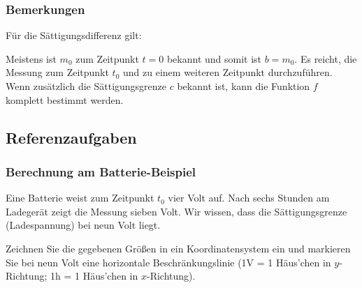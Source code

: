 \subsubsection{Bemerkungen}
\begin{bemerkung}{}{}
  Für die Sättigungsdifferenz gilt:

\end{bemerkung}



\begin{bemerkung}{}{}
Meistens ist $m_0$ zum Zeitpunkt $t=0$ bekannt und somit ist $b=m_0$. Es reicht, die Messung zum Zeitpunkt $t_0$ und zu einem weiteren Zeitpunkt durchzuführen. Wenn zusätzlich die Sättigungsgrenze $c$ bekannt ist, kann die Funktion $f$ komplett bestimmt werden.
\end{bemerkung} 

\newpage

\subsection{Referenzaufgaben}

\subsubsection{Berechnung am Batterie-Beispiel}
Eine Batterie weist zum Zeitpunkt $t_0$ vier Volt auf. Nach sechs Stunden am Ladegerät zeigt die Messung sieben Volt. Wir wissen, dass die Sättigungsgrenze (Ladespannung) bei neun Volt liegt.

Zeichnen Sie die gegebenen Größen in ein Koordinatensystem ein und markieren Sie bei neun Volt eine horizontale Beschränkungslinie (\zB 1V = 1 Häus'chen in $y$-Richtung; 1h = 1 Häus'chen in $x$-Richtung).


